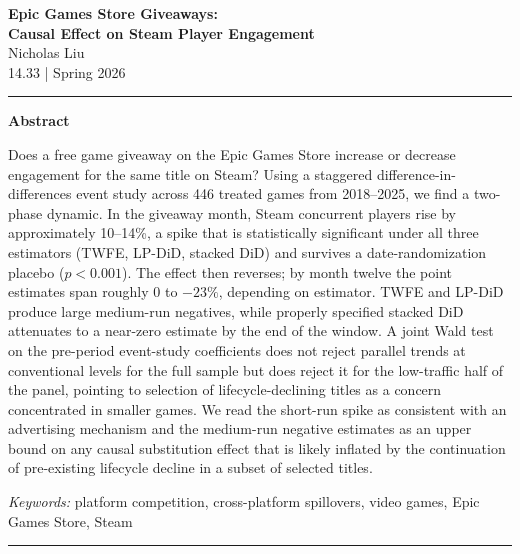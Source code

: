 \documentclass[11pt]{article}
\begin{document}
\begin{center}
  {\LARGE\bfseries Epic Games Store Giveaways:\\[0.3em]
   Causal Effect on Steam Player Engagement}\\[1em]
  {\large Nicholas Liu}\\[0.4em]
  {\normalsize 14.33 | Spring 2026}\\[0.4em]
\end{center}

\vspace{0.8em}
\hrule
\vspace{1em}

\begin{center}
  \textbf{Abstract}
\end{center}

\noindent Does a free game giveaway on the Epic Games Store increase or decrease
engagement for the same title on Steam? Using a staggered difference-in-differences
event study across 446 treated games from 2018--2025, we find a two-phase dynamic.
In the giveaway month, Steam concurrent players rise by approximately 10--14\%, a
spike that is statistically significant under all three estimators (TWFE, LP-DiD,
stacked DiD) and survives a date-randomization placebo ($p<0.001$). The effect then
reverses; by month twelve the point estimates span roughly $0$ to $-23\%$, depending on
estimator. TWFE and LP-DiD produce large medium-run negatives, while
properly specified stacked DiD attenuates
to a near-zero estimate by the end of the window. A joint Wald test on the
pre-period event-study coefficients does not reject parallel trends at
conventional levels for the full sample but does
reject it for the low-traffic half of the panel, pointing to selection of
lifecycle-declining titles as a concern concentrated in smaller games.
We read the short-run spike as consistent with an advertising mechanism and the
medium-run negative estimates as an upper bound on any causal substitution effect
that is likely inflated by the continuation of pre-existing lifecycle decline in a
subset of selected titles.

\vspace{0.5em}
\noindent\textit{Keywords:} platform competition, cross-platform spillovers, video games, Epic Games Store, Steam

\vspace{1em}
\hrule
\vspace{1em}
\end{document}
